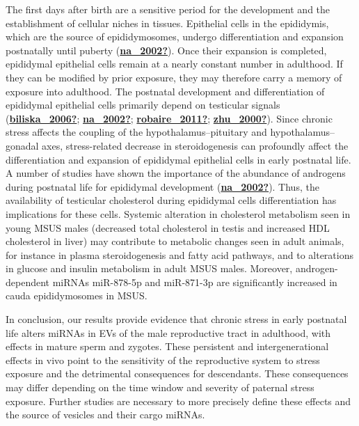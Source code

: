 \documentclass[12pt,twoside]{reedthesis}
\begin{document}
The first days after birth are a sensitive period for the development
and the establishment of cellular niches in tissues. Epithelial cells in
the epididymis, which are the source of epididymosomes, undergo
differentiation and expansion postnatally until puberty (\protect\hyperlink{ref-na_2002}{\textbf{na\_2002?}}). Once
their expansion is completed, epididymal epithelial cells remain at a
nearly constant number in adulthood. If they can be modified by prior
exposure, they may therefore carry a memory of exposure into adulthood.
The postnatal development and differentiation of epididymal epithelial
cells primarily depend on testicular signals (\protect\hyperlink{ref-biliska_2006}{\textbf{biliska\_2006?}}; \protect\hyperlink{ref-na_2002}{\textbf{na\_2002?}}; \protect\hyperlink{ref-robaire_2011}{\textbf{robaire\_2011?}}; \protect\hyperlink{ref-zhu_2000}{\textbf{zhu\_2000?}}). Since chronic stress affects the coupling of
the hypothalamus--pituitary and hypothalamus--gonadal axes,
stress-related decrease in steroidogenesis can profoundly affect the
differentiation and expansion of epididymal epithelial cells in early
postnatal life. A number of studies have shown the importance of the
abundance of androgens during postnatal life for epididymal development
(\protect\hyperlink{ref-na_2002}{\textbf{na\_2002?}}). Thus, the availability of testicular cholesterol during
epididymal cells differentiation has implications for these cells.
Systemic alteration in cholesterol metabolism seen in young MSUS males
(decreased total cholesterol in testis and increased HDL cholesterol in
liver) may contribute to metabolic changes seen in adult animals, for
instance in plasma steroidogenesis and fatty acid pathways, and to
alterations in glucose and insulin metabolism in adult MSUS males.
Moreover, androgen-dependent miRNAs miR-878-5p and miR-871-3p are
significantly increased in cauda epididymosomes in MSUS.

In conclusion, our results provide evidence that chronic stress in early
postnatal life alters miRNAs in EVs of the male reproductive tract in
adulthood, with effects in mature sperm and zygotes. These persistent
and intergenerational effects in vivo point to the sensitivity of the
reproductive system to stress exposure and the detrimental consequences
for descendants. These consequences may differ depending on the time
window and severity of paternal stress exposure. Further studies are
necessary to more precisely define these effects and the source of
vesicles and their cargo miRNAs.

\newpage
\end{document}
